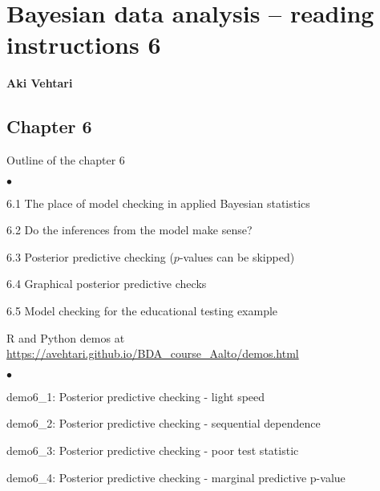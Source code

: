 \documentclass[a4paper,11pt,english]{article}
\begin{document}
\thispagestyle{empty}

\section*{Bayesian data analysis -- reading instructions 6} 
\smallskip
{\bf Aki Vehtari}
\smallskip

\subsection*{Chapter 6}

Outline of the chapter 6
\begin{list}{$\bullet$}{\parsep=0pt\itemsep=2pt}
\item 6.1 The place of model checking in applied Bayesian statistics
\item 6.2 Do the inferences from the model make sense?
\item 6.3 Posterior predictive checking ($p$-values can be skipped)
\item 6.4 Graphical posterior predictive checks
\item 6.5 Model checking for the educational testing example
\end{list}

R and Python demos at \url{https://avehtari.github.io/BDA_course_Aalto/demos.html}
\begin{list}{$\bullet$}{\parsep=0pt\itemsep=2pt}
\item demo6\_1: Posterior predictive checking - light speed
\item demo6\_2: Posterior predictive checking - sequential dependence
\item demo6\_3: Posterior predictive checking - poor test statistic
\item demo6\_4: Posterior predictive checking - marginal predictive p-value
\end{list}
\end{document}

